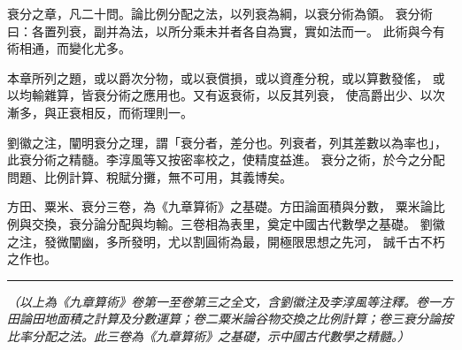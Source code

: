 \documentclass[11pt,a4paper]{article}
\begin{document}
\begin{quoting}
衰分之章，凡二十問。論比例分配之法，以列衰為綱，以衰分術為領。
衰分術曰：各置列衰，副并為法，以所分乘未并者各自為實，實如法而一。
此術與今有術相通，而變化尤多。

本章所列之題，或以爵次分物，或以衰償損，或以資產分稅，或以算數發傜，
或以均輸雜算，皆衰分術之應用也。又有返衰術，以反其列衰，
使高爵出少、以次漸多，與正衰相反，而術理則一。

劉徽之注，闡明衰分之理，謂「衰分者，差分也。列衰者，列其差數以為率也」，
此衰分術之精髓。李淳風等又按密率校之，使精度益進。
衰分之術，於今之分配問題、比例計算、稅賦分攤，無不可用，其義博矣。

方田、粟米、衰分三卷，為《九章算術》之基礎。方田論面積與分數，
粟米論比例與交換，衰分論分配與均輸。三卷相為表里，奠定中國古代數學之基礎。
劉徽之注，發微闡幽，多所發明，尤以割圓術為最，開極限思想之先河，
誠千古不朽之作也。
\end{quoting}

\vspace{1em}
\begin{center}
\rule{0.5\textwidth}{0.4pt}
\end{center}

\vspace{1em}

\begin{center}
\textit{（以上為《九章算術》卷第一至卷第三之全文，含劉徽注及李淳風等注釋。卷一方田論田地面積之計算及分數運算；卷二粟米論谷物交換之比例計算；卷三衰分論按比率分配之法。此三卷為《九章算術》之基礎，示中國古代數學之精髓。）}
\end{center}
\end{document}

